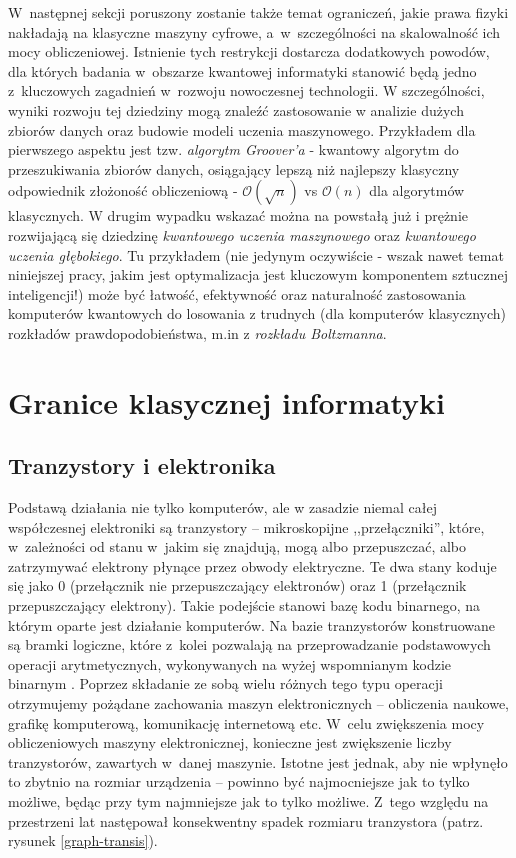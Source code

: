\documentclass[12pt,a4paper,twoside,openany]{book}
\begin{document}
W~następnej sekcji poruszony zostanie także temat ograniczeń, jakie prawa fizyki nakładają na klasyczne maszyny cyfrowe, a~w~szczególności na skalowalność ich mocy obliczeniowej.
Istnienie tych restrykcji dostarcza dodatkowych powodów, dla których badania w~obszarze kwantowej informatyki stanowić będą jedno z~kluczowych zagadnień w~rozwoju nowoczesnej technologii.
W szczególności, wyniki rozwoju tej dziedziny mogą znaleźć zastosowanie w analizie dużych zbiorów danych oraz budowie modeli uczenia maszynowego.
Przykładem dla pierwszego aspektu jest tzw. \textit{algorytm Groover'a} - kwantowy algorytm do przeszukiwania zbiorów danych, osiągający lepszą niż najlepszy klasyczny odpowiednik złożoność obliczeniową - $\mathcal{O}(\sqrt{n})$ vs $\mathcal{O}(n)$ dla algorytmów klasycznych.
W drugim wypadku wskazać można na powstałą już i prężnie rozwijającą się dziedzinę \textit{kwantowego uczenia maszynowego} oraz \textit{kwantowego uczenia głębokiego}. 
Tu przykładem (nie jedynym oczywiście - wszak nawet temat niniejszej pracy, jakim jest optymalizacja jest kluczowym komponentem sztucznej inteligencji!) może być łatwość, efektywność oraz naturalność zastosowania komputerów kwantowych do losowania z trudnych (dla komputerów klasycznych) rozkładów prawdopodobieństwa, m.in z \textit{rozkładu Boltzmanna}.


\section{Granice klasycznej informatyki}

\subsection{Tranzystory i elektronika}
Podstawą działania nie tylko komputerów, ale w zasadzie niemal całej współczesnej elektroniki są tranzystory – mikroskopijne ,,przełączniki'', które, w~zależności od stanu w~jakim się znajdują, mogą albo przepuszczać, albo zatrzymywać elektrony płynące przez obwody elektryczne.
Te dwa stany koduje się jako 0 (przełącznik nie przepuszczający elektronów) oraz 1 (przełącznik przepuszczający elektrony). 
Takie podejście stanowi bazę kodu binarnego, na którym oparte jest działanie komputerów.
Na bazie tranzystorów konstruowane są bramki logiczne, które z~kolei pozwalają na przeprowadzanie podstawowych operacji arytmetycznych, wykonywanych na wyżej wspomnianym kodzie binarnym \citep{} .
Poprzez składanie ze sobą wielu różnych tego typu operacji otrzymujemy pożądane zachowania maszyn elektronicznych – obliczenia naukowe, grafikę komputerową, komunikację internetową etc.
W~celu zwiększenia mocy obliczeniowych maszyny elektronicznej, konieczne jest zwiększenie liczby tranzystorów, zawartych w~danej maszynie.
Istotne jest jednak, aby nie wpłynęło to zbytnio na rozmiar urządzenia – powinno być najmocniejsze jak to tylko możliwe, będąc przy tym najmniejsze jak to tylko możliwe. 
Z~tego względu na przestrzeni lat następował konsekwentny spadek rozmiaru tranzystora (patrz. rysunek \ref{graph-transis}).
\end{document}
